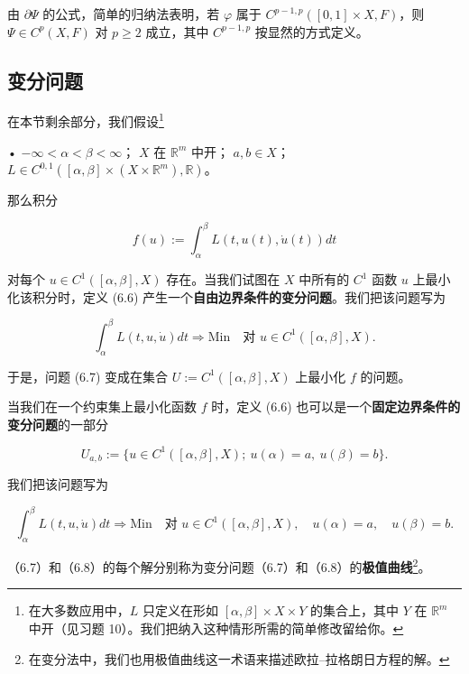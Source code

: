由 $ \partial\Psi $ 的公式，简单的归纳法表明，若 $ \varphi $ 属于 $ C^{p-1,p}([0, 1] \times X, F) $，则 $ \Psi \in C^{p}(X, F) $ 对 $ p \ge 2 $ 成立，其中 $ C^{p-1,p} $ 按显然的方式定义。

\subsection*{变分问题}

在本节剩余部分，我们假设\footnote{在大多数应用中，$ L $ 只定义在形如 $ [\alpha, \beta] \times X \times Y $ 的集合上，其中 $ Y $ 在 $ \mathbb{R}^{m} $ 中开（见习题 10）。我们把纳入这种情形所需的简单修改留给你。}

• $ -\infty < \alpha < \beta < \infty $；
  $ X $ 在 $ \mathbb{R}^{m} $ 中开；
  $ a, b \in X $；
  $ L \in C^{0,1}([\alpha, \beta] \times (X \times \mathbb{R}^{m}), \mathbb{R}) $。

那么积分

\begin{equation}
f(u) := \int_{\alpha}^{\beta}L(t, u(t), \dot{u}(t)) dt\tag{6.6}
\end{equation}

对每个 $ u \in C^{1}([\alpha, \beta], X) $ 存在。当我们试图在 $ X $ 中所有的 $ C^{1} $ 函数 $ u $ 上最小化该积分时，定义 (6.6) 产生一个\textbf{自由边界条件的变分问题}。我们把该问题写为

\begin{equation}
\int_{\alpha}^{\beta}L(t, u, \dot{u}) dt \Rightarrow \mathrm{Min} \quad \text{对 } u \in C^{1}([\alpha, \beta], X) .\tag{6.7}
\end{equation}

于是，问题 (6.7) 变成在集合 $ U := C^{1}([\alpha, \beta], X) $ 上最小化 $ f $ 的问题。

当我们在一个约束集上最小化函数 $ f $ 时，定义 (6.6) 也可以是一个\textbf{固定边界条件的变分问题}的一部分

\[
U_{a,b} := \{ u \in C^{1}([\alpha, \beta], X) ;\ u(\alpha) = a ,\ u(\beta) = b \} .
\]

我们把该问题写为

\begin{equation}
\int_{\alpha}^{\beta}L(t, u, \dot{u}) dt \Rightarrow \mathrm{Min} \quad \text{对 } u \in C^{1}([\alpha, \beta], X) , \quad u(\alpha) = a , \quad u(\beta) = b .\tag{6.8}
\end{equation}

（6.7）和（6.8）的每个解分别称为变分问题（6.7）和（6.8）的\textbf{极值曲线}\footnote{在变分法中，我们也用极值曲线这一术语来描述欧拉–拉格朗日方程的解。}。

